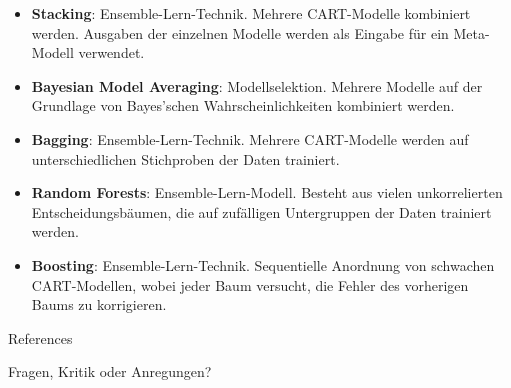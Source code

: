 \documentclass{beamer}
\begin{document}
\begin{frame}
		\begin{itemize}
			\item\textbf{Stacking}: Ensemble-Lern-Technik. Mehrere CART-Modelle kombiniert werden. Ausgaben der einzelnen Modelle  werden als Eingabe für ein Meta-Modell verwendet.
			\item\textbf{Bayesian Model Averaging}: Modellselektion. Mehrere Modelle auf der Grundlage von Bayes'schen Wahrscheinlichkeiten kombiniert werden.
			\item\textbf{Bagging}: Ensemble-Lern-Technik. Mehrere CART-Modelle werden auf unterschiedlichen Stichproben der Daten trainiert.
			\item\textbf{Random Forests}: Ensemble-Lern-Modell. Besteht aus vielen unkorrelierten Entscheidungsbäumen, die auf zufälligen Untergruppen der Daten trainiert werden.
			\item\textbf{Boosting}: Ensemble-Lern-Technik. Sequentielle Anordnung von schwachen CART-Modellen, wobei jeder Baum versucht, die Fehler des vorherigen Baums zu korrigieren.
		\end{itemize}
\end{frame}



\appendix

\begin{frame}[allowframebreaks]{References}
	
	\nocite{*}
	
\end{frame}

\begin{frame}[focus]

	Fragen, Kritik oder Anregungen?
	
\end{frame}

\end{document}
